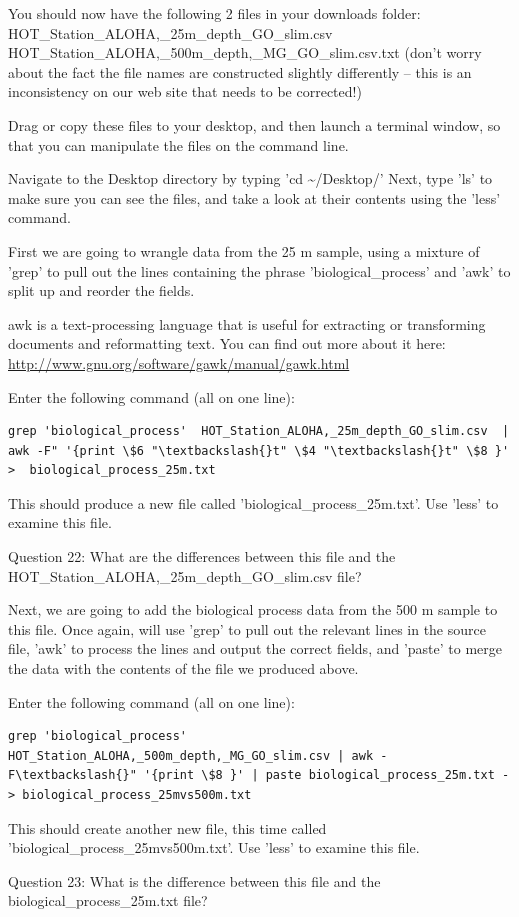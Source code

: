 You should now have the following 2 files in your downloads folder: HOT\_Station\_ALOHA,\_25m\_depth\_GO\_slim.csv
HOT\_Station\_ALOHA,\_500m\_depth,\_MG\_GO\_slim.csv.txt
(don't worry about the fact the file names are constructed slightly differently – this is an inconsistency on our web site that needs to be corrected!)

\begin{steps}
Drag or copy these files to your desktop, and then launch a terminal window, so that you can manipulate the files on the command line.
  
Navigate to the Desktop directory by typing 'cd \textasciitilde{}/Desktop/'   Next, type 'ls' to make sure you can see the files, and take a look at their contents using the 'less' command.
\end{steps}

First we are going to wrangle data from the 25 m sample, using a mixture of 'grep' to pull out the lines containing the phrase 'biological\_process' and 'awk' to split up and reorder the fields. 

awk is a text-processing language that is useful for extracting or transforming documents and reformatting text. You can find out more about it here: \url{http://www.gnu.org/software/gawk/manual/gawk.html}

\begin{steps}
Enter the following command (all on one line):
\begin{lstlisting}
grep 'biological_process'  HOT_Station_ALOHA,_25m_depth_GO_slim.csv  | awk -F" '{print \$6 "\textbackslash{}t" \$4 "\textbackslash{}t" \$8 }'  >  biological_process_25m.txt

\end{lstlisting}
This should produce a new file called 'biological\_process\_25m.txt'. Use 'less' to examine this file.

Question 22: What are the differences between this file and the HOT\_Station\_ALOHA,\_25m\_depth\_GO\_slim.csv  file?

\end{steps}

Next, we are going to add the biological process data from the 500 m sample to this file.  Once again, will use 'grep' to pull out the relevant lines in the source file, 'awk' to process the lines and output the correct fields, and 'paste' to merge the data with the contents of the file we produced above.

\begin{steps}
Enter the following command (all on one line):
\begin{lstlisting}
grep 'biological_process' HOT_Station_ALOHA,_500m_depth,_MG_GO_slim.csv | awk -F\textbackslash{}" '{print \$8 }' | paste biological_process_25m.txt - > biological_process_25mvs500m.txt

\end{lstlisting}
This should create another new file, this time called 'biological\_process\_25mvs500m.txt'. Use 'less' to examine this file.
  
Question 23: What is the difference between this file and the biological\_process\_25m.txt file?
\end{steps}

